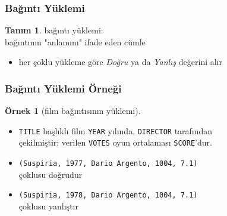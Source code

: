 \documentclass[dvipsnames]{beamer}
\theoremstyle{definition}
\newtheorem{tanim}[theorem]{Tanım}
\theoremstyle{example}
\newtheorem{ornek}[theorem]{Örnek}
\theoremstyle{plain}
\begin{document}
\begin{frame}
  \frametitle{Bağıntı Yüklemi}

  \begin{tanim}
    \alert{bağıntı yüklemi}:\\
      bağıntının "anlamını" ifade eden cümle
  \end{tanim}

  \begin{itemize}
    \item her çoklu yükleme göre \emph{Doğru} ya da \emph{Yanlış} değerini alır
  \end{itemize}
\end{frame}

\begin{frame}
  \frametitle{Bağıntı Yüklemi Örneği}

  \begin{ornek}[film bağıntısının yüklemi]
    \begin{itemize}
      \item \texttt{TITLE} başlıklı film \texttt{YEAR} yılında,
        \texttt{DIRECTOR} tarafından\\
        çekilmiştir; verilen \texttt{VOTES} oyun ortalaması \texttt{SCORE}'dur.

      \pause
      \medskip
      \item \texttt{(Suspiria, 1977, Dario Argento, 1004, 7.1)}\\
        çoklusu doğrudur
      \item \texttt{(Suspiria, 1978, Dario Argento, 1004, 7.1)}\\
        çoklusu yanlıştır
    \end{itemize}
  \end{ornek}
\end{frame}
\end{document}
